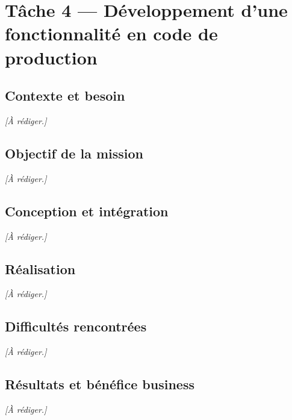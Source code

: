 \chapter{Tâche 4 — Développement d'une fonctionnalité en code de production}
\label{chap:t4}

\section{Contexte et besoin}
\emph{[À rédiger.]}

\section{Objectif de la mission}
\emph{[À rédiger.]}

\section{Conception et intégration}
\emph{[À rédiger.]}

\section{Réalisation}
\emph{[À rédiger.]}

\section{Difficultés rencontrées}
\emph{[À rédiger.]}

\section{Résultats et bénéfice business}
\emph{[À rédiger.]}
